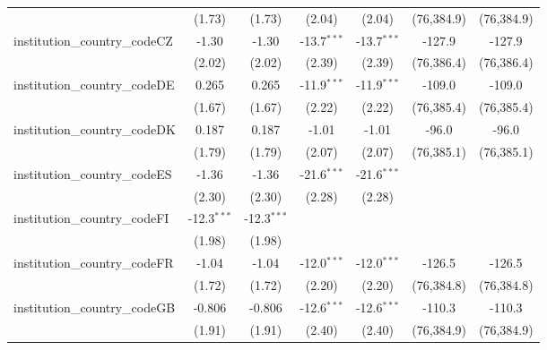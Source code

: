 \begin{tabular}{lcccccc}
                                         & (1.73)        & (1.73)        & (2.04)        & (2.04)        & (76,384.9)   & (76,384.9)\\   
   institution\_country\_codeCZ          & -1.30         & -1.30         & -13.7$^{***}$ & -13.7$^{***}$ & -127.9       & -127.9\\   
                                         & (2.02)        & (2.02)        & (2.39)        & (2.39)        & (76,386.4)   & (76,386.4)\\   
   institution\_country\_codeDE          & 0.265         & 0.265         & -11.9$^{***}$ & -11.9$^{***}$ & -109.0       & -109.0\\   
                                         & (1.67)        & (1.67)        & (2.22)        & (2.22)        & (76,385.4)   & (76,385.4)\\   
   institution\_country\_codeDK          & 0.187         & 0.187         & -1.01         & -1.01         & -96.0        & -96.0\\   
                                         & (1.79)        & (1.79)        & (2.07)        & (2.07)        & (76,385.1)   & (76,385.1)\\   
   institution\_country\_codeES          & -1.36         & -1.36         & -21.6$^{***}$ & -21.6$^{***}$ &              &   \\   
                                         & (2.30)        & (2.30)        & (2.28)        & (2.28)        &              &   \\   
   institution\_country\_codeFI          & -12.3$^{***}$ & -12.3$^{***}$ &               &               &              &   \\   
                                         & (1.98)        & (1.98)        &               &               &              &   \\   
   institution\_country\_codeFR          & -1.04         & -1.04         & -12.0$^{***}$ & -12.0$^{***}$ & -126.5       & -126.5\\   
                                         & (1.72)        & (1.72)        & (2.20)        & (2.20)        & (76,384.8)   & (76,384.8)\\   
   institution\_country\_codeGB          & -0.806        & -0.806        & -12.6$^{***}$ & -12.6$^{***}$ & -110.3       & -110.3\\   
                                         & (1.91)        & (1.91)        & (2.40)        & (2.40)        & (76,384.9)   & (76,384.9)\\   

\end{tabular}
